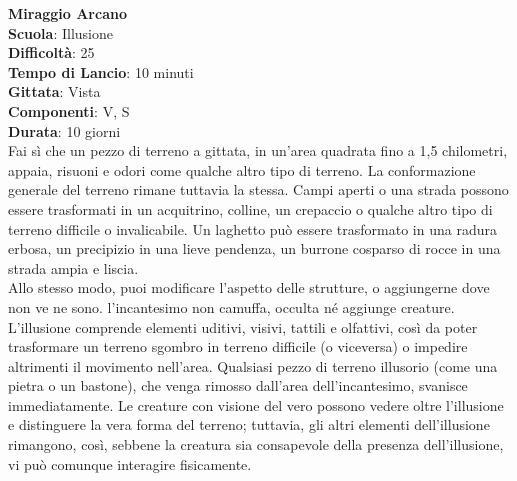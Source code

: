 \begin{multicols}{2}
\medskip\textbf{Miraggio Arcano}\\
\textbf{Scuola}: Illusione\\
\textbf{Difficoltà}:  25\\
\textbf{Tempo di Lancio}: 10 minuti\\
\textbf{Gittata}: Vista\\
\textbf{Componenti}: V, S\\
\textbf{Durata}: 10 giorni\\
Fai sì che un pezzo di terreno a gittata, in un'area quadrata fino a 1,5 chilometri, appaia, risuoni e odori come qualche altro tipo di terreno. La conformazione generale del terreno rimane tuttavia la stessa. Campi aperti o una strada possono essere trasformati in un acquitrino, colline, un crepaccio o qualche altro tipo di terreno difficile o invalicabile. Un laghetto può essere trasformato in una radura erbosa, un precipizio in una lieve pendenza, un burrone cosparso di rocce in una strada ampia e liscia.\\
Allo stesso modo, puoi modificare l’aspetto delle strutture, o aggiungerne dove non ve ne sono. l'incantesimo non camuffa, occulta né aggiunge creature.\\
L’illusione comprende elementi uditivi, visivi, tattili e olfattivi, così da poter trasformare un terreno sgombro in terreno difficile (o viceversa) o impedire altrimenti il movimento nell'area. Qualsiasi pezzo di terreno illusorio (come una pietra o un bastone), che venga rimosso dall'area dell'incantesimo, svanisce immediatamente. Le creature con visione del vero possono vedere oltre l’illusione e distinguere la vera forma del terreno; tuttavia, gli altri elementi dell'illusione rimangono, così, sebbene la creatura sia consapevole della presenza dell'illusione, vi può comunque interagire fisicamente. 


\end{multicols}
